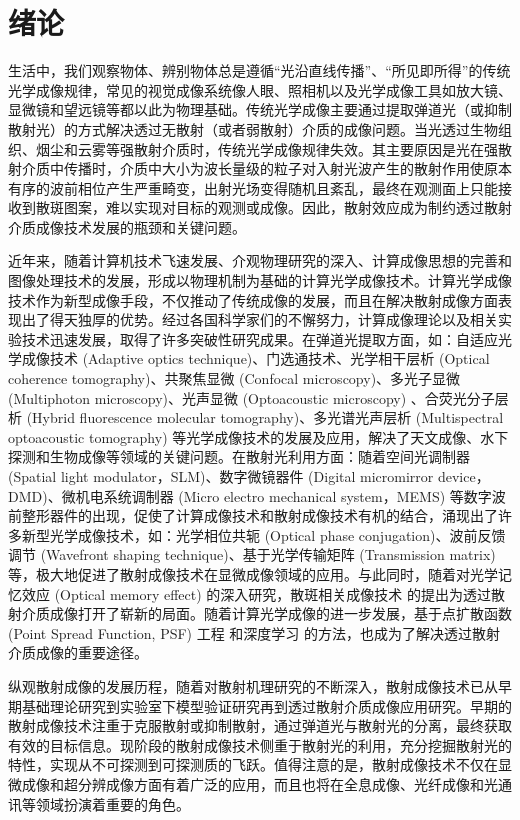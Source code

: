 
\chapter{绪论}
生活中，我们观察物体、辨别物体总是遵循“光沿直线传播”、“所见即所得”的传统光学成像规律，常见的视觉成像系统像人眼、照相机以及光学成像工具如放大镜、显微镜和望远镜等都以此为物理基础。传统光学成像主要通过提取弹道光（或抑制散射光）的方式解决透过无散射（或者弱散射）介质的成像问题。当光透过生物组织、烟尘和云雾等强散射介质时，传统光学成像规律失效。其主要原因是光在强散射介质中传播时，介质中大小为波长量级的粒子对入射光波产生的散射作用使原本有序的波前相位产生严重畸变，出射光场变得随机且紊乱，最终在观测面上只能接收到散斑图案，难以实现对目标的观测或成像。因此，散射效应成为制约透过散射介质成像技术发展的瓶颈和关键问题。

近年来，随着计算机技术飞速发展、介观物理研究的深入、计算成像思想的完善和图像处理技术的发展，形成以物理机制为基础的计算光学成像技术。计算光学成像技术作为新型成像手段，不仅推动了传统成像的发展，而且在解决散射成像方面表现出了得天独厚的优势。经过各国科学家们的不懈努力，计算成像理论以及相关实验技术迅速发展，取得了许多突破性研究成果。在弹道光提取方面，如：自适应光学成像技术 (Adaptive optics technique)、门选通技术、光学相干层析 (Optical coherence tomography)、共聚焦显微 (Confocal microscopy)、多光子显微 (Multiphoton microscopy)、光声显微 (Optoacoustic microscopy) 、合荧光分子层析 (Hybrid fluorescence molecular tomography)、多光谱光声层析 (Multispectral optoacoustic tomography) 等光学成像技术的发展及应用，解决了天文成像、水下探测和生物成像等领域的关键问题。在散射光利用方面：随着空间光调制器 (Spatial light modulator，SLM)、数字微镜器件 (Digital micromirror device，DMD)、微机电系统调制器 (Micro electro mechanical system，MEMS) 等数字波前整形器件的出现，促使了计算成像技术和散射成像技术有机的结合，涌现出了许多新型光学成像技术，如：光学相位共轭 (Optical phase conjugation)、波前反馈调节 (Wavefront shaping technique)、基于光学传输矩阵 (Transmission matrix) 等，极大地促进了散射成像技术在显微成像领域的应用。与此同时，随着对光学记忆效应 (Optical memory effect) 的深入研究，散斑相关成像技术 的提出为透过散射介质成像打开了崭新的局面。随着计算光学成像的进一步发展，基于点扩散函数 (Point Spread Function, PSF) 工程 和深度学习 的方法，也成为了解决透过散射介质成像的重要途径。

纵观散射成像的发展历程，随着对散射机理研究的不断深入，散射成像技术已从早期基础理论研究到实验室下模型验证研究再到透过散射介质成像应用研究。早期的散射成像技术注重于克服散射或抑制散射，通过弹道光与散射光的分离，最终获取有效的目标信息。现阶段的散射成像技术侧重于散射光的利用，充分挖掘散射光的特性，实现从不可探测到可探测质的飞跃。值得注意的是，散射成像技术不仅在显微成像和超分辨成像方面有着广泛的应用，而且也将在全息成像、光纤成像和光通讯等领域扮演着重要的角色。

